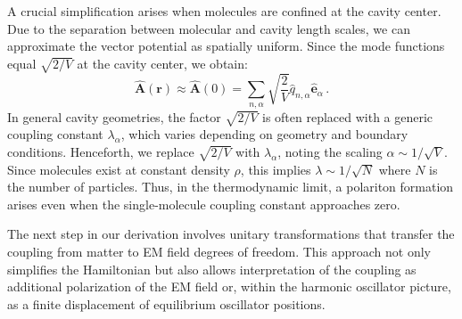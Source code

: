 \documentclass[%
 reprint,
 amsmath,amssymb,
 aps,
]{revtex4-2}
\begin{document}
A crucial simplification arises when molecules are confined at the cavity center.
Due to the separation between molecular and cavity length scales, we can approximate the vector potential as spatially uniform.
Since the mode functions equal $\sqrt{2/V}$ at the cavity center, we obtain:
\begin{equation}
\hat{\bm A}(\bm r) \approx \hat{\bm A}(0) = \sum_{n,\alpha} \sqrt{\frac{2}{V}} \hat{q}_{n,\alpha} \hat{\bm e}_\alpha \,.
\end{equation}
In general cavity geometries, the factor $\sqrt{2/V}$ is often replaced with a generic coupling constant $\lambda_\alpha$, which varies depending on geometry and boundary conditions.
Henceforth, we replace $\sqrt{2/V}$ with $\lambda_\alpha$, noting the scaling $\alpha \sim 1/\sqrt{V}$.
Since molecules exist at constant density $\rho$, this implies $\lambda\sim 1/\sqrt{N}$ where $N$ is the number of particles.
Thus, in the thermodynamic limit, a polariton formation arises even when the single-molecule coupling constant approaches zero. 

The next step in our derivation involves unitary transformations that transfer the coupling from matter to EM field degrees of freedom.
This approach not only simplifies the Hamiltonian but also allows interpretation of the coupling as additional polarization of the EM field or, within the harmonic oscillator picture, as a finite displacement of equilibrium oscillator positions. 
\end{document}
